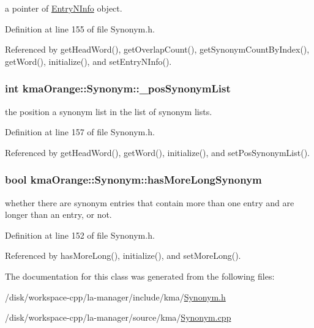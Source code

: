 a pointer of \hyperlink{classkmaOrange_1_1EntryNInfo}{EntryNInfo} object. 



Definition at line 155 of file Synonym.h.

Referenced by getHeadWord(), getOverlapCount(), getSynonymCountByIndex(), getWord(), initialize(), and setEntryNInfo().\hypertarget{classkmaOrange_1_1Synonym_088adf1a98bb1770a497cd8203e54af0}{
\subsubsection[{\_\-posSynonymList}]{\setlength{\rightskip}{0pt plus 5cm}int {\bf kmaOrange::Synonym::\_\-posSynonymList}}}
\label{classkmaOrange_1_1Synonym_088adf1a98bb1770a497cd8203e54af0}


the position a synonym list in the list of synonym lists. 



Definition at line 157 of file Synonym.h.

Referenced by getHeadWord(), getWord(), initialize(), and setPosSynonymList().\hypertarget{classkmaOrange_1_1Synonym_39a70d8546ba006043d510c7c9439296}{
\subsubsection[{hasMoreLongSynonym}]{\setlength{\rightskip}{0pt plus 5cm}bool {\bf kmaOrange::Synonym::hasMoreLongSynonym}}}
\label{classkmaOrange_1_1Synonym_39a70d8546ba006043d510c7c9439296}


whether there are synonym entries that contain more than one entry and are longer than an entry, or not. 



Definition at line 152 of file Synonym.h.

Referenced by hasMoreLong(), initialize(), and setMoreLong().

The documentation for this class was generated from the following files:\begin{CompactItemize}
\item 
/disk/workspace-cpp/la-manager/include/kma/\hyperlink{Synonym_8h}{Synonym.h}\item 
/disk/workspace-cpp/la-manager/source/kma/\hyperlink{Synonym_8cpp}{Synonym.cpp}\end{CompactItemize}
